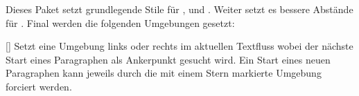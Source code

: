 Dieses Paket setzt grundlegende Stile für ,  und .  Weiter setzt es bessere Abstände für . Final werden die folgenden Umgebungen gesetzt:

%
%
%

[\cmdlist{}\cmdlist\secline{}\cmdlist{}]
Setzt eine Umgebung links oder rechts im aktuellen Textfluss wobei der nächste Start eines Paragraphen als Ankerpunkt gesucht wird. Ein Start eines neuen Paragraphen kann jeweils durch die mit einem Stern markierte Umgebung forciert werden. 
